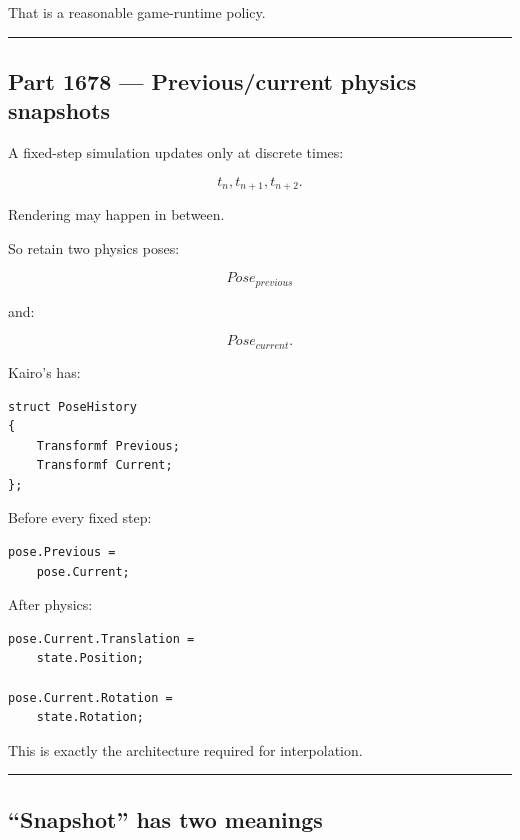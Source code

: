 That is a reasonable game-runtime policy.

\begin{center}\rule{0.5\linewidth}{0.5pt}\end{center}

\subsection{Part 1678 --- Previous/current physics snapshots}\label{06-engine-ii-ch037-part-1678-previouscurrent-physics-snapshots}

\hypertarget{06-engine-ii-ch037-part-1678-previouscurrent-physics-snapshots}{}

A fixed-step simulation updates only at discrete times:

\[
t_n,
t_{n+1},
t_{n+2}.
\]

Rendering may happen in between.

So retain two physics poses:

\[
Pose_{previous}
\]

and:

\[
Pose_{current}.
\]

Kairo's  has:

\begin{verbatim}
struct PoseHistory
{
    Transformf Previous;
    Transformf Current;
};
\end{verbatim}

Before every fixed step:

\begin{verbatim}
pose.Previous =
    pose.Current;
\end{verbatim}

After physics:

\begin{verbatim}
pose.Current.Translation =
    state.Position;

pose.Current.Rotation =
    state.Rotation;
\end{verbatim}

This is exactly the architecture required for interpolation.

\begin{center}\rule{0.5\linewidth}{0.5pt}\end{center}

\subsection{``Snapshot'' has two meanings}\label{06-engine-ii-ch037-snapshot-has-two-meanings}

